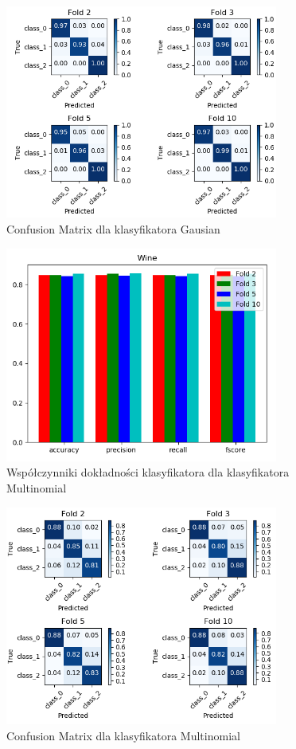 \documentclass[12pt,a4paper]{article}
\begin{document}
\begin{figure}[H]
\centering
\includegraphics[width=0.8\textwidth]{gConfusion.PNG}
\caption{Confusion Matrix dla klasyfikatora Gausian}
\end{figure}

\begin{figure}[H]
\centering
\includegraphics[width=0.8\textwidth]{mMeasure.PNG}
\caption{Współczynniki dokładności klasyfikatora dla klasyfikatora Multinomial}
\end{figure}

\begin{figure}[H]
\centering
\includegraphics[width=0.8\textwidth]{mConfusion.PNG}
\caption{Confusion Matrix dla klasyfikatora Multinomial}
\end{figure}
\end{document}
